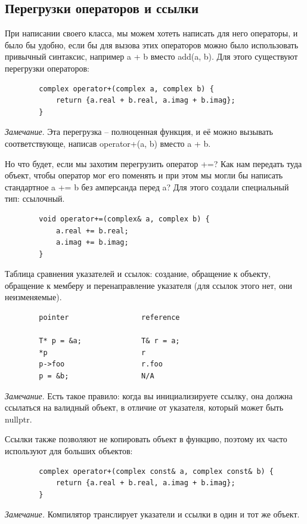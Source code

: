 \documentclass[12pt, a4paper]{article}
\begin{document}
	\subsection{Перегрузки операторов и ссылки}\par При написании своего класса, мы можем хотеть написать для него операторы, и было бы удобно, если бы для вызова этих операторов можно было использовать привычный синтаксис, например a + b вместо add(a, b). Для этого существуют перегрузки операторов:
	\begin{verbatim}
		complex operator+(complex a, complex b) {
			return {a.real + b.real, a.imag + b.imag};
		}
	\end{verbatim}
	\textit{Замечание}. Эта перегрузка -- полноценная функция, и её можно вызывать соответствующе, написав operator+(a, b) вместо a + b.\\\par
	Но что будет, если мы захотим перегрузить оператор +=? Как нам передать туда объект, чтобы оператор мог его поменять и при этом мы могли бы написать стандартное a += b без амперсанда перед a? Для этого создали специальный тип: ссылочный.
	\begin{verbatim}
		void operator+=(complex& a, complex b) {
			a.real += b.real;
			a.imag += b.imag;
		}
	\end{verbatim}
	\par Таблица сравнения указателей и ссылок: создание, обращение к объекту, обращение к мемберу и перенаправление указателя (для ссылок этого нет, они неизменяемые).
	\begin{verbatim}
		pointer                 reference
		
		T* p = &a;              T& r = a;
		*p                      r
		p->foo                  r.foo
		p = &b;                 N/A
	\end{verbatim}
	\textit{Замечание}. Есть такое правило: когда вы инициализируете ссылку, она должна ссылаться на валидный объект, в отличие от указателя, который может быть nullptr.
	\\\par Ссылки также позволяют не копировать объект в функцию, поэтому их часто используют для больших объектов:
	\begin{verbatim}
		complex operator+(complex const& a, complex const& b) {
			return {a.real + b.real, a.imag + b.imag};
		}
	\end{verbatim}
	\textit{Замечание.} Компилятор транслирует указатели и ссылки в один и тот же объект.
\end{document}
